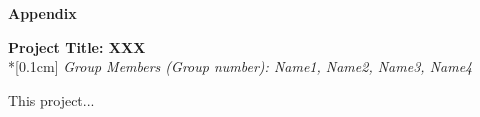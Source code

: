 \documentclass[runningheads]{llncs}
\begin{document}

\begin{flushleft}
\huge{\textbf{Appendix}}
\end{flushleft}
\begin{center}
\Large{\textbf{Project Title:  XXX }} \\*[0.1cm]%
\large{\emph{Group Members (Group number): Name1, Name2, Name3, Name4}} %
\end{center}


\noindent This project...
\end{document}
